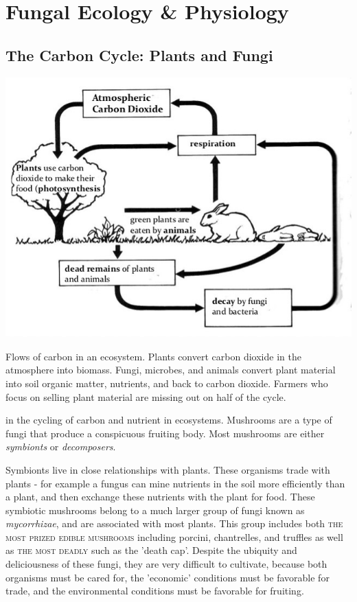 \documentclass{tufte-handout}
\begin{document}
\section{Fungal Ecology \&  Physiology}



\subsection{The Carbon Cycle: Plants and Fungi}

\begin{marginfigure}
\includegraphics{c-cycle.jpg}
\caption{Flows of carbon in an ecosystem.
Plants convert carbon dioxide in the atmosphere into biomass. Fungi, microbes, and animals convert plant material into soil organic matter, nutrients, and back to carbon dioxide.
Farmers who focus on selling plant material are missing out on half of the cycle.}
\end{marginfigure}

 in the cycling of carbon and nutrient in ecosystems. Mushrooms are a type of fungi that produce a conspicuous 
fruiting body. Most mushrooms are either \emph{symbionts} or \emph{decomposers}.

Symbionts live in close relationships with plants. 
These organisms trade with plants - for example a fungus can mine nutrients in the soil more efficiently than a plant, and then exchange these nutrients with the plant for food.
These symbiotic mushrooms belong to a much larger group of fungi known as \emph{mycorrhizae}, and are associated with most plants. This group includes both \textsc{the most prized edible mushrooms} including porcini, chantrelles, and truffles as well as \textsc{the most deadly} such as the 'death cap'. 
Despite the ubiquity and deliciousness of these fungi, they are very difficult to cultivate, because both organisms must be cared for, the 'economic' conditions must be favorable for trade, and the environmental conditions must be favorable for fruiting.
\end{document}
